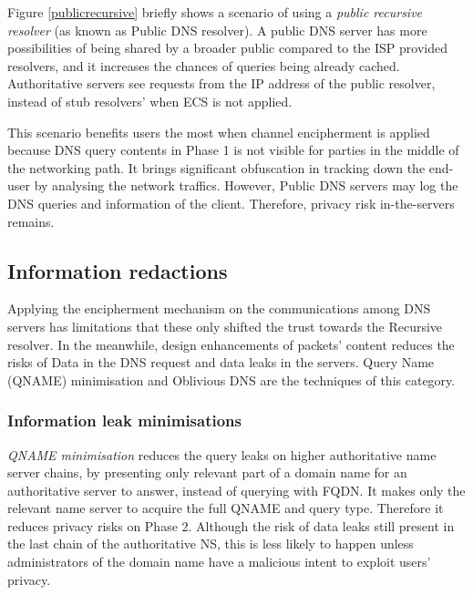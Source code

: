 Figure \ref{publicrecursive} briefly shows a scenario of using a \textit{public recursive resolver} (as known as Public DNS resolver).
A public DNS server has more possibilities of being shared by a broader public compared to the ISP provided resolvers, and it increases the chances of queries being already cached. Authoritative servers see requests from the IP address of the public resolver, instead of stub resolvers' when ECS is not applied.

This scenario benefits users the most when channel encipherment is applied because DNS query contents in Phase 1 is not visible for parties in the middle of the networking path. It brings significant obfuscation in tracking down the end-user by analysing the network traffics. However, Public DNS servers may log the DNS queries and information of the client. Therefore, privacy risk in-the-servers remains.

\FloatBarrier
\subsection{Information redactions}
Applying the encipherment mechanism on the communications among DNS servers has limitations that these only shifted the trust towards the Recursive resolver.
In the meanwhile, design enhancements of packets' content reduces the risks of Data in the DNS request and data leaks in the servers.
Query Name (QNAME) minimisation \cite{bortzmeyer2016dns} and Oblivious DNS \cite{annee-dprive-oblivious-dns-00} are the techniques of this category.

\subsubsection{Information leak minimisations}
\textit{QNAME minimisation} reduces the query leaks on higher authoritative name server chains, by presenting only relevant part of a domain name for an authoritative server to answer, instead of querying with FQDN.
It makes only the relevant name server to acquire the full QNAME and query type. Therefore it reduces privacy risks on Phase 2.
Although the risk of data leaks still present in the last chain of the authoritative NS, this is less likely to happen unless administrators of the domain name have a malicious intent to exploit users' privacy.

